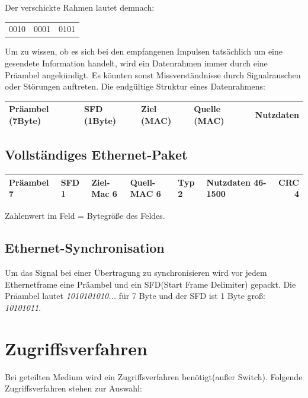 \documentclass[12pt,a4paper]{article}
\begin{document}
			Der verschickte Rahmen lautet demnach:
			\begin{center}
				\begin{tabularx}{5cm}{XXX}
					0010&0001&0101\\
				\end{tabularx}
			\end{center}
			Um zu wissen, ob es sich bei den empfangenen Impulsen tatsächlich um eine gesendete Information handelt, wird ein Datenrahmen immer durch eine Präambel angekündigt. Es könnten sonst Missverständnisse durch Signalrauschen oder Störungen auftreten. Die endgültige Struktur eines Datenrahmens:
			\begin{center}
				\begin{tabularx}{17cm}{|l|l|X|X|X|}
					\hline
					Präambel (7Byte)&SFD (1Byte)&Ziel (MAC)&Quelle (MAC)&Nutzdaten\\
					\hline
				\end{tabularx}
			\end{center}
		   
		\subsection{Vollständiges Ethernet-Paket}
			\begin{center}
				\renewcommand{\arraystretch}{1.5}
				\begin{tabularx}{17cm}{|l|l|l|X|X|X|r|}
					\hline
					Präambel 7&SFD 1&Ziel-Mac 6&Quell-MAC 6&Typ 2&Nutzdaten 46-1500&CRC 4\\
					\hline
				\end{tabularx}
			\end{center}
			\begin{center}
				Zahlenwert im Feld = Bytegröße des Feldes.
			\end{center}

		\subsection{Ethernet-Synchronisation}
			Um das Signal bei einer Übertragung zu synchronisieren wird vor jedem Ethernetframe eine Präambel und ein SFD(Start Frame Delimiter) gepackt. Die Präambel lautet \textit{1010101010...} für 7 Byte und der SFD ist 1 Byte groß: \textit{10101011}.
		
	\section{Zugriffsverfahren}
		Bei geteilten Medium wird ein Zugriffsverfahren benötigt(außer Switch). Folgende Zugriffsverfahren stehen zur Auswahl:
		
\end{document}

